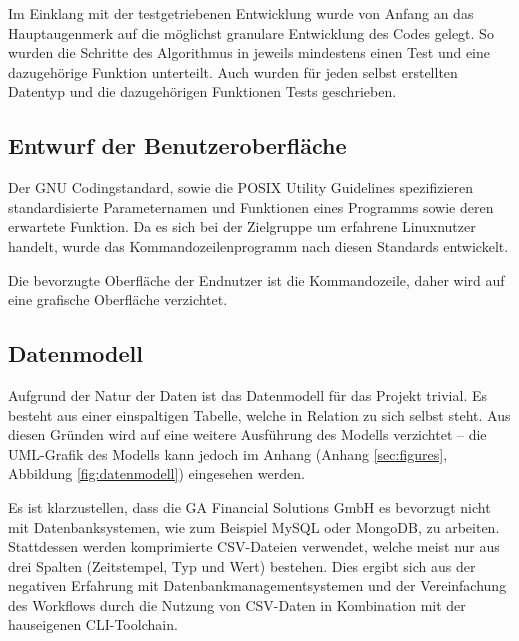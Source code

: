 Im Einklang mit der testgetriebenen Entwicklung wurde von Anfang an das Hauptaugenmerk
auf die möglichst granulare Entwicklung des Codes gelegt. So wurden die Schritte
des Algorithmus in jeweils mindestens einen Test und eine dazugehörige Funktion unterteilt.
Auch wurden für jeden selbst erstellten Datentyp und die dazugehörigen Funktionen Tests geschrieben.




\subsection{Entwurf der Benutzeroberfläche}
Der GNU Codingstandard\cite{gnuCodingStandard},
sowie die POSIX Utility Guidelines\cite{posixGuidelines}
spezifizieren standardisierte Parameternamen und Funktionen eines Programms sowie
deren erwartete Funktion. Da es sich bei der Zielgruppe um erfahrene Linuxnutzer handelt, wurde das Kommandozeilenprogramm nach diesen Standards entwickelt.\par

Die bevorzugte Oberfläche der Endnutzer ist die Kommandozeile, daher wird auf eine grafische Oberfläche verzichtet.

\subsection{Datenmodell}
Aufgrund der Natur der Daten ist das Datenmodell für das Projekt trivial. Es besteht aus einer
einspaltigen Tabelle, welche in Relation zu sich selbst steht. Aus diesen Gründen wird auf eine weitere Ausführung des 
Modells verzichtet -- die UML-Grafik des Modells kann jedoch im Anhang (Anhang \ref{sec:figures}, Abbildung \ref{fig:datenmodell}) eingesehen werden.

Es ist klarzustellen, dass die GA Financial Solutions GmbH es bevorzugt nicht mit Datenbanksystemen, wie
 zum Beispiel MySQL oder MongoDB, zu arbeiten. Stattdessen werden komprimierte CSV-Dateien verwendet, welche
meist nur aus drei Spalten (Zeitstempel, Typ und Wert) bestehen. Dies ergibt sich aus
der negativen Erfahrung mit Datenbankmanagementsystemen und der Vereinfachung des Workflows durch
die Nutzung von CSV-Daten in Kombination mit der hauseigenen CLI-Toolchain.


